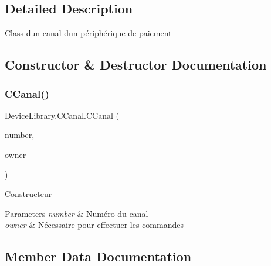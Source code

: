 \subsection{Detailed Description}
Class d\textquotesingle{}un canal d\textquotesingle{}un périphérique de paiement 



\subsection{Constructor \& Destructor Documentation}
\mbox{\label{class_device_library_1_1_c_canal_a31af2f08cfb27d40798116fdc0cfb372}} 
\subsubsection{\texorpdfstring{C\+Canal()}{CCanal()}}
{\footnotesize\ttfamily Device\+Library.\+C\+Canal.\+C\+Canal (\begin{DoxyParamCaption}\item[{byte}]{number,  }\item[{\mbox{\hyperlink{class_device_library_1_1_c_coin_validator}{C\+Coin\+Validator}}}]{owner }\end{DoxyParamCaption})\hspace{0.3cm}{\ttfamily [inline]}}



Constructeur 


\begin{DoxyParams}{Parameters}
{\em number} & Numéro du canal\\
\hline
{\em owner} & Nécessaire pour effectuer les commandes\\
\hline
\end{DoxyParams}


\subsection{Member Data Documentation}
\mbox{\label{class_device_library_1_1_c_canal_a5b9fc2885e84a372334c45007f8b5cf8}} 
